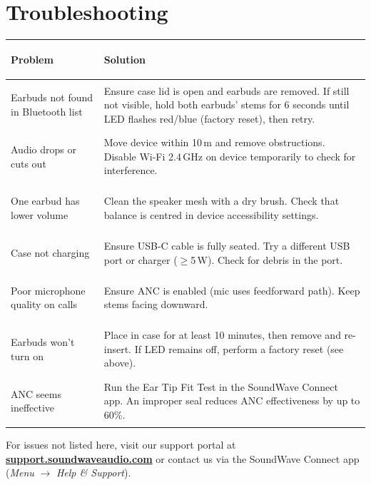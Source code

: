 \section{Troubleshooting}

\renewcommand{\arraystretch}{1.3}
\setlength{\parskip}{0pt}

\begin{tabularx}{\linewidth}{@{}
  >{\color{accent}\bfseries\raggedright}p{52mm}
  @{\hspace{6mm}}
  >{\raggedright\arraybackslash}X
@{}}
\toprule
\textcolor{accent}{Problem} & \textbf{Solution} \\
\midrule
Earbuds not found in Bluetooth list
  & Ensure case lid is open and earbuds are removed. If still not visible, hold both
    earbuds' stems for 6 seconds until LED flashes red/blue (factory reset), then retry. \\
\addlinespace
Audio drops or cuts out
  & Move device within 10\,m and remove obstructions. Disable Wi-Fi 2.4\,GHz on device
    temporarily to check for interference. \\
\addlinespace
One earbud has lower volume
  & Clean the speaker mesh with a dry brush. Check that balance is centred in device
    accessibility settings. \\
\addlinespace
Case not charging
  & Ensure USB-C cable is fully seated. Try a different USB port or charger ($\geq$5\,W).
    Check for debris in the port. \\
\addlinespace
Poor microphone quality on calls
  & Ensure ANC is enabled (mic uses feedforward path). Keep stems facing downward. \\
\addlinespace
Earbuds won't turn on
  & Place in case for at least 10 minutes, then remove and re-insert. If LED remains off,
    perform a factory reset (see above). \\
\addlinespace
ANC seems ineffective
  & Run the Ear Tip Fit Test in the SoundWave Connect app. An improper seal reduces
    ANC effectiveness by up to 60\%. \\
\bottomrule
\end{tabularx}

\setlength{\parskip}{4pt}
\renewcommand{\arraystretch}{1}

\vspace{6pt}
\begin{infobox}
  For issues not listed here, visit our support portal at
  \href{https://support.soundwaveaudio.com}{\textbf{support.soundwaveaudio.com}} or contact us
  via the SoundWave Connect app (\textit{Menu} $\to$ \textit{Help \& Support}).
\end{infobox}

